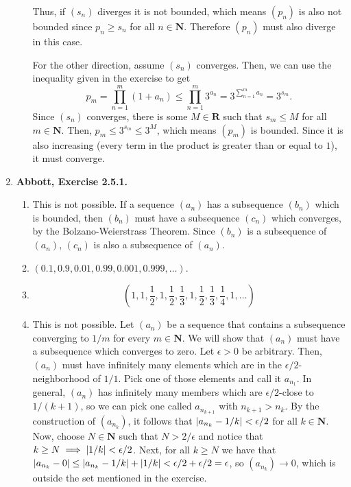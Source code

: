 \documentclass{article}
\DeclarePairedDelimiter\abs{\lvert}{\rvert}
\newcommand{\N}{\mathbf{N}}
\newcommand{\R}{\mathbf{R}}
\newcommand{\exc}[2][Abbott]{\item \textbf{#1, Exercise #2.}}
\newcommand{\lep}[1][L]{#1et $\epsilon > 0$ be arbitrary}
\begin{document}
\begin{enumerate}
\begin{enumerate}
        Thus, if $(s_n)$ diverges it is not bounded, which means $(p_n)$ is also not bounded since $p_n \geq s_n$ for all $n \in \N$. Therefore $(p_n)$ must also diverge in this case.
        
        For the other direction, assume $(s_n)$ converges. Then, we can use the inequality given in the exercise to get 
        \begin{equation*}
            p_m = \prod_{n=1}^m (1+a_n) \leq \prod_{n=1}^m 3^{a_n} 
            = 3^{\sum\limits_{n=1}^m a_n} = 3^{s_m}.
        \end{equation*} Since $(s_n)$ converges, there is some $M \in \R$ such that $s_m \leq M$ for all $m \in \N$. Then, $p_m \leq 3^{s_m}\leq 3^M$, which means $(p_m)$ is bounded. Since it is also increasing (every term in the product is greater than or equal to $1$), it must converge.
    \end{enumerate}
    
    \exc{2.5.1}
    \begin{enumerate}
        \item This is not possible. If a sequence $(a_n)$ has a subsequence $(b_n)$ which is bounded, then $(b_n)$ must have a subsequence $(c_n)$ which converges, by the Bolzano-Weierstrass Theorem. Since $(b_n)$ is a subsequence of $(a_n)$, $(c_n)$ is also a subsequence of $(a_n)$.
        
        \item $(0.1,0.9,0.01,0.99,0.001,0.999, \dots)$.
        
        \item \begin{equation*}
            (1, 1, \frac{1}{2}, 1, \frac{1}{2}, \frac{1}{3}, 1, \frac{1}{2}, \frac{1}{3}, \frac{1}{4}, 1, \dots)
        \end{equation*}
        
        \item This is not possible. Let $(a_n)$ be a sequence that contains a subsequence converging to $1/m$ for every $m \in \N$. We will show that $(a_n)$ must have a subsequence which converges to zero. \lep. Then, $(a_n)$ must have infinitely many elements which are in the $\epsilon/2$-neighborhood of $1/1$. Pick one of those elements and call it $a_{n_1}$. In general, $(a_n)$ has infinitely many members which are $\epsilon/2$-close to $1/(k+1)$, so we can pick one called $a_{n_{k+1}}$ with $n_{k+1} > n_k$. By the construction of $(a_{n_k})$, it follows that $\abs*{a_{n_k} - 1/k} < \epsilon/2$ for all $k \in \N$. Now, choose $N \in \N$ such that $N > 2/\epsilon$ and notice that $k \geq N \implies \abs*{1/k} < \epsilon/2$. Next, for all $k \geq N$ we have that $\abs*{a_{n_k}-0} \leq \abs*{a_{n_k}-1/k}+\abs*{1/k} < \epsilon/2 + \epsilon/2 = \epsilon$, so $(a_{n_k}) \to 0$, which is outside the set mentioned in the exercise.
    \end{enumerate}
    

\end{enumerate}
\end{document}

